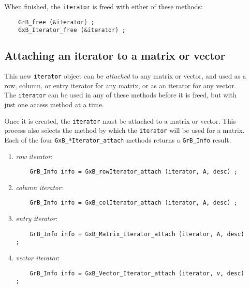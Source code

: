 \documentclass[12pt]{article}
\begin{document}
When finished, the \verb'iterator' is freed with either of these methods:

    {\footnotesize
    \begin{verbatim}
    GrB_free (&iterator) ;
    GxB_Iterator_free (&iterator) ; \end{verbatim}}

\subsection{Attaching an iterator to a matrix or vector}

This new \verb'iterator' object can be {\em attached} to any matrix or vector,
and used as a row, column, or entry iterator for any matrix, or as an iterator
for any vector.  The \verb'iterator' can be used in any of these methods before
it is freed, but with just one access method at a time.

Once it is created, the \verb'iterator' must be attached to a matrix or
vector.  This process also selects the method by which the \verb'iterator'
will be used for a matrix.  Each of the four \verb'GxB_*Iterator_attach'
methods returns a \verb'GrB_Info' result.

    \begin{enumerate}
    \item {\em row iterator}:
    {\footnotesize
    \begin{verbatim}
    GrB_Info info = GxB_rowIterator_attach (iterator, A, desc) ; \end{verbatim}}
    \item {\em column iterator}:
    {\footnotesize
    \begin{verbatim}
    GrB_Info info = GxB_colIterator_attach (iterator, A, desc) ; \end{verbatim}}
    \item {\em entry iterator}:
    {\footnotesize
    \begin{verbatim}
    GrB_Info info = GxB_Matrix_Iterator_attach (iterator, A, desc) ; \end{verbatim}}
    \item {\em vector iterator}:
    {\footnotesize
    \begin{verbatim}
    GrB_Info info = GxB_Vector_Iterator_attach (iterator, v, desc) ; \end{verbatim}}
    \end{enumerate}
\end{document}

